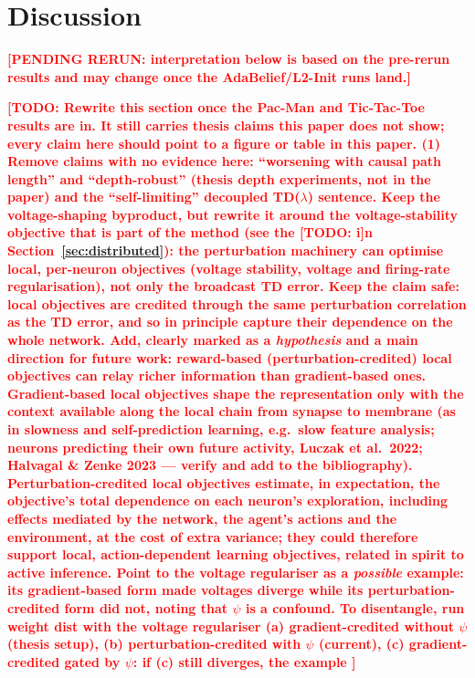 \documentclass[10pt,twocolumn]{article}
\newcommand{\pending}[1]{\textcolor{red}{\bfseries[PENDING RERUN#1]}}
\newcommand{\todo}[1]{\textcolor{red}{\bfseries[TODO: #1]}}
\begin{document}
\section{Discussion}
\label{sec:discussion}
\pending{: interpretation below is based on the pre-rerun results and may
change once the AdaBelief/L2-Init runs land.}

\todo{Rewrite this section once the Pac-Man and Tic-Tac-Toe results are in.
It still carries thesis claims this paper does not show; every claim here
should point to a figure or table in this paper. (1) Remove claims with no
evidence here: ``worsening with causal path length'' and ``depth-robust''
(thesis depth experiments, not in the paper) and the ``self-limiting''
decoupled TD($\lambda$) sentence. Keep the voltage-shaping byproduct, but
rewrite it around the voltage-stability objective that is part of the method
(see the \todo in Section~\ref{sec:distributed}): the perturbation machinery
can optimise local, per-neuron objectives (voltage stability, voltage and
firing-rate regularisation), not only the broadcast TD error. Keep the claim safe:
local objectives are credited through the same perturbation correlation as the
TD error, and so in principle capture their dependence on the whole network.
Add, clearly marked as a \emph{hypothesis} and a main direction for future
work: reward-based (perturbation-credited) local objectives can relay richer
information than gradient-based ones. Gradient-based local objectives shape the
representation only with the context available along the local chain from
synapse to membrane (as in slowness and self-prediction learning, e.g.\ slow
feature analysis; neurons predicting their own future activity, Luczak et al.\
2022; Halvagal \& Zenke 2023 --- verify and add to the bibliography). Perturbation-credited
local objectives estimate, in expectation, the objective's total dependence on
each neuron's exploration, including effects mediated by the network, the
agent's actions and the environment, at the cost of extra variance; they could
therefore support local, action-dependent learning objectives, related in
spirit to active inference. Point to the voltage regulariser as a
\emph{possible} example: its gradient-based form made voltages diverge while
its perturbation-credited form did not, noting that $\psi$ is a confound. To
disentangle, run weight dist with the voltage regulariser (a) gradient-credited
without $\psi$ (thesis setup), (b) perturbation-credited with $\psi$ (current),
(c) gradient-credited gated by $\psi$: if (c) still diverges, the example
}
\end{document}

